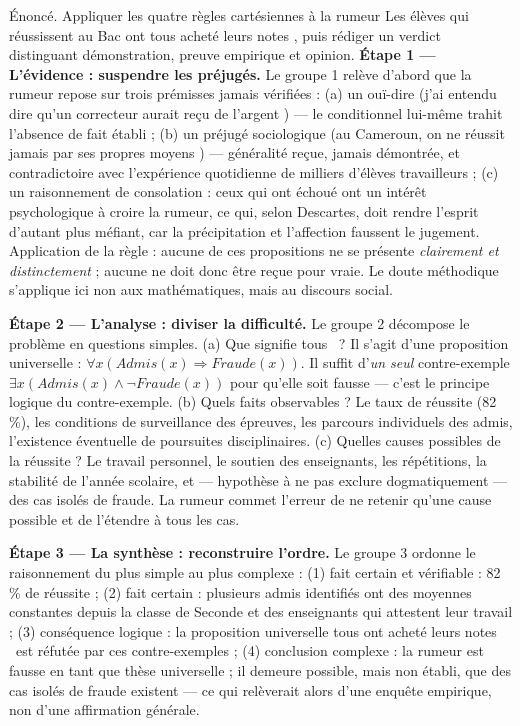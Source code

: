 \documentclass[11pt]{article}
\newcounter{popsec}
\newcounter{popsub}
\newcommand{\courssub}[1]{%
  \stepcounter{popsub}%
  \par\vspace{9pt}\noindent{\popxbold\fontsize{11.5}{13}\selectfont\color{popink}{\color{poporange}\thepopsec.\thepopsub}\hspace{6pt}#1}\par\nopagebreak\vspace{4pt}
}
\begin{document}
\courssub{Démarche et corrigé commenté}

\begin{exoresolu}
Énoncé. Appliquer les quatre règles cartésiennes à la rumeur \guillemotleft Les élèves qui réussissent au Bac ont tous acheté leurs notes \guillemotright, puis rédiger un verdict distinguant démonstration, preuve empirique et opinion.
\tcblower
\textbf{Étape 1 — L'évidence : suspendre les préjugés.} Le groupe 1 relève d'abord que la rumeur repose sur trois prémisses jamais vérifiées : (a) un ouï-dire (\guillemotleft j'ai entendu dire qu'un correcteur aurait reçu de l'argent \guillemotright) — le conditionnel lui-même trahit l'absence de fait établi ; (b) un préjugé sociologique (\guillemotleft au Cameroun, on ne réussit jamais par ses propres moyens \guillemotright) — généralité reçue, jamais démontrée, et contradictoire avec l'expérience quotidienne de milliers d'élèves travailleurs ; (c) un raisonnement de consolation : ceux qui ont échoué ont un intérêt psychologique à croire la rumeur, ce qui, selon Descartes, doit rendre l'esprit d'autant plus méfiant, car la précipitation et l'affection faussent le jugement. Application de la règle : aucune de ces propositions ne se présente \emph{clairement et distinctement} ; aucune ne doit donc être reçue pour vraie. Le doute méthodique s'applique ici non aux mathématiques, mais au discours social.

\textbf{Étape 2 — L'analyse : diviser la difficulté.} Le groupe 2 décompose le problème en questions simples. (a) Que signifie \guillemotleft tous \guillemotright\ ? Il s'agit d'une proposition universelle : $\forall x (Admis(x) \Rightarrow Fraude(x))$. Il suffit d'\emph{un seul} contre-exemple $\exists x (Admis(x) \land \neg Fraude(x))$ pour qu'elle soit fausse — c'est le principe logique du contre-exemple. (b) Quels faits observables ? Le taux de réussite (82 \%), les conditions de surveillance des épreuves, les parcours individuels des admis, l'existence éventuelle de poursuites disciplinaires. (c) Quelles causes possibles de la réussite ? Le travail personnel, le soutien des enseignants, les répétitions, la stabilité de l'année scolaire, et — hypothèse à ne pas exclure dogmatiquement — des cas isolés de fraude. La rumeur commet l'erreur de ne retenir qu'une cause possible et de l'étendre à tous les cas.

\textbf{Étape 3 — La synthèse : reconstruire l'ordre.} Le groupe 3 ordonne le raisonnement du plus simple au plus complexe : (1) fait certain et vérifiable : 82 \% de réussite ; (2) fait certain : plusieurs admis identifiés ont des moyennes constantes depuis la classe de Seconde et des enseignants qui attestent leur travail ; (3) conséquence logique : la proposition universelle \guillemotleft tous ont acheté leurs notes \guillemotright\ est réfutée par ces contre-exemples ; (4) conclusion complexe : la rumeur est fausse en tant que thèse universelle ; il demeure possible, mais non établi, que des cas isolés de fraude existent — ce qui relèverait alors d'une enquête empirique, non d'une affirmation générale.


\end{exoresolu}
\end{document}
